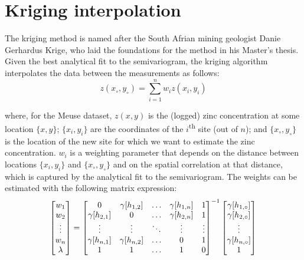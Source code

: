 \section{Kriging interpolation}
\label{sec:kriging}

The kriging method is named after the South Afrian mining geologist
Danie Gerhardus Krige, who laid the foundations for the method in his
Master's thesis.  Given the best analytical fit to the semivariogram,
the kriging algorithm interpolates the data between the measurements
as follows:
\begin{equation}
z(x_\circ,y_\circ) = \sum\limits_{i=1}^n w_i z(x_i,y_i)
\label{eq:kriging}
\end{equation}

\noindent where, for the Meuse dataset, $z(x,y)$ is the (logged) zinc
concentration at some location $\{x,y\}$; $\{x_i,y_i\}$ are the
coordinates of the $i$\textsuperscript{th} site (out of $n$); and
$\{x_\circ,y_\circ\}$ is the location of the new site for which we
want to estimate the zinc concentration. $w_i$ is a weighting
parameter that depends on the distance between locations $\{x_i,y_i\}$
and $\{x_\circ,y_\circ\}$ and on the spatial correlation at that
distance, which is captured by the analytical fit to the
semivariogram. The weights can be estimated with the following matrix
expression:
\begin{equation}
  \left[
    \begin{array}{@{}c@{}}
      w_1 \\
      w_2 \\
      \vdots \\
      w_n \\
      \lambda
    \end{array}
    \right]
  =
  \left[
    \begin{array}{@{}ccccc@{}}
      0 & \gamma[h_{1,2}] & \ldots & \gamma[h_{1,n}] & 1 \\
      \gamma[h_{2,1}] & 0 & \ldots & \gamma[h_{2,n}] & 1 \\
      \vdots & \vdots & \ddots & \vdots & \vdots \\
      \gamma[h_{n,1}] & \gamma[h_{n,2}] & \ldots & 0 & 1 \\
      1 & 1 & \ldots & 1 & 0 \\
    \end{array}
    \right]^{-1}
  \left[
    \begin{array}{@{}c@{}}
      \gamma[h_{1,\circ}] \\
      \gamma[h_{2,\circ}] \\
      \vdots \\
      \gamma[h_{n,\circ}]\\
      1
    \end{array}
    \right]
\label{eq:krigingweights}
\end{equation}

